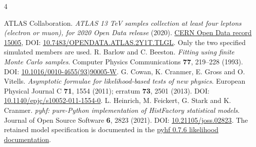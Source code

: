 \documentclass[aps,prd,reprint,superscriptaddress,nofootinbib,longbibliography,floatfix]{revtex4-2}
\begin{document}
\begin{thebibliography}{4}

ATLAS Collaboration. \emph{ATLAS 13 TeV samples collection at least four leptons (electron
or muon), for 2020 Open Data release} (2020).
\href{https://opendata.cern.ch/record/15005}{CERN Open Data record 15005}, DOI:
\href{https://doi.org/10.7483/OPENDATA.ATLAS.2Y1T.TLGL}{10.7483/OPENDATA.ATLAS.2Y1T.TLGL}.
Only the two specified simulated members are used.
R. Barlow and C. Beeston. \emph{Fitting using finite Monte Carlo samples}. Computer Physics
Communications \textbf{77}, 219--228 (1993). DOI:
\href{https://doi.org/10.1016/0010-4655(93)90005-W}{10.1016/0010-4655(93)90005-W}.
G. Cowan, K. Cranmer, E. Gross and O. Vitells. \emph{Asymptotic formulae for
likelihood-based tests of new physics}. European Physical Journal C \textbf{71}, 1554
(2011); erratum \textbf{73}, 2501 (2013). DOI:
\href{https://doi.org/10.1140/epjc/s10052-011-1554-0}{10.1140/epjc/s10052-011-1554-0}.
L. Heinrich, M. Feickert, G. Stark and K. Cranmer. \emph{pyhf: pure-Python implementation of
HistFactory statistical models}. Journal of Open Source Software \textbf{6}, 2823 (2021).
DOI: \href{https://doi.org/10.21105/joss.02823}{10.21105/joss.02823}. The retained model
specification is documented in the
\href{https://pyhf.readthedocs.io/en/v0.7.6/likelihood.html}{pyhf 0.7.6 likelihood
documentation}.
\end{thebibliography}
\end{document}
